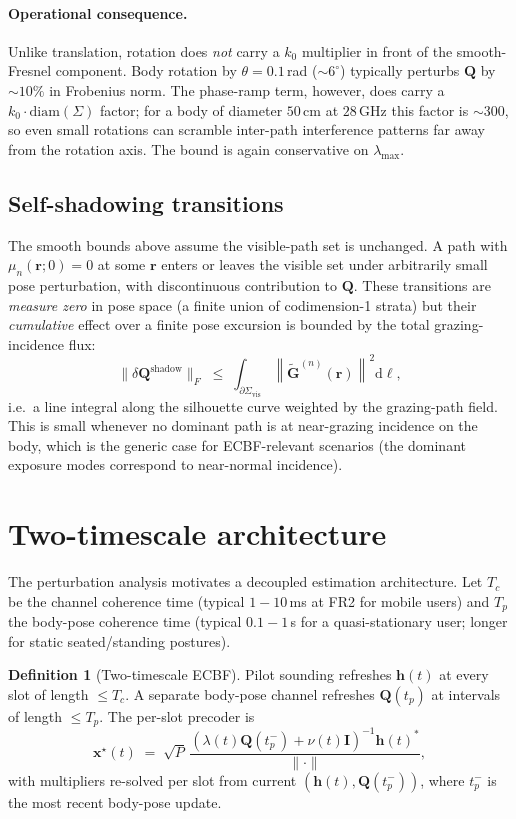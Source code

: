 \documentclass[11pt,a4paper]{article}
\theoremstyle{definition}
\newtheorem{definition}[theorem]{Definition}
\newcommand{\rr}{\mathbf{r}}
\newcommand{\xx}{\mathbf{x}}
\newcommand{\hh}{\mathbf{h}}
\newcommand{\Q}{\mathbf{Q}}
\newcommand{\Gt}{\tilde{\mathbf{G}}}
\newcommand{\Sigmaset}{\Sigma}
\newcommand{\lammax}{\lambda_{\max}}
\newcommand{\diff}{\mathrm{d}}
\begin{document}
\paragraph{Operational consequence.} Unlike translation, rotation does
\emph{not} carry a $k_0$ multiplier in front of the smooth-Fresnel
component. Body rotation by $\theta\!=\!0.1\,$rad ($\sim 6^\circ$)
typically perturbs $\Q$ by $\sim\!10\%$ in Frobenius norm. The
phase-ramp term, however, does carry a $k_0\!\cdot\!\mathrm{diam}(\Sigmaset)$
factor; for a body of diameter $50\,$cm at $28\,$GHz this factor is
$\sim\!300$, so even small rotations can scramble inter-path interference
patterns far away from the rotation axis. The bound is again conservative
on $\lammax$.

\subsection{Self-shadowing transitions}

The smooth bounds above assume the visible-path set is unchanged.
A path with $\mu_n(\rr;0)=0$ at some $\rr$ enters or leaves the
visible set under arbitrarily small pose perturbation, with discontinuous
contribution to $\Q$. These transitions are \emph{measure zero} in pose
space (a finite union of codimension-1 strata) but their
\emph{cumulative} effect over a finite pose excursion is bounded by the
total grazing-incidence flux:
\[
  \|\delta\Q^{\mathrm{shadow}}\|_F \;\le\;
  \int_{\partial\Sigmaset_{\mathrm{vis}}}
  \left\|\Gt^{(n)}(\rr)\right\|^2 \diff\ell,
\]
i.e.\ a line integral along the silhouette curve weighted by the
grazing-path field. This is small whenever no dominant path is at
near-grazing incidence on the body, which is the generic case for
ECBF-relevant scenarios (the dominant exposure modes correspond to
near-normal incidence).

\section{Two-timescale architecture}
\label{sec:timescales}

The perturbation analysis motivates a decoupled estimation architecture.
Let $T_c$ be the channel coherence time (typical $1{-}10\,$ms at FR2 for
mobile users) and $T_p$ the body-pose coherence time (typical
$0.1{-}1\,$s for a quasi-stationary user; longer for static seated/standing
postures).

\begin{definition}[Two-timescale ECBF]
\label{def:two-timescale}
Pilot sounding refreshes $\hh(t)$ at every slot of length $\le T_c$.
A separate body-pose channel refreshes $\Q(t_p)$ at intervals of
length $\le T_p$. The per-slot precoder is
\[
  \xx^\star(t) \;=\; \sqrt{P}\,
                  \frac{(\lambda(t)\Q(t_p^-) + \nu(t)\mathbf{I})^{-1}\hh(t)^*}
                       {\|\cdot\|},
\]
with multipliers re-solved per slot from current $(\hh(t),\Q(t_p^-))$,
where $t_p^-$ is the most recent body-pose update.
\end{definition}
\end{document}
